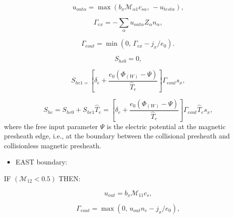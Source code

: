 \documentclass[11pt]{article}
\begin{document}
\begin{equation}
u_{out\alpha}=\max\left( b_{x}\mathcal{M}_{\alpha1}c_{s\alpha}\text{, }%
-u_{test\alpha}\right) \text{,}   \label{c184}
\end{equation}

\begin{equation}
\Gamma_{ex}=-\sum_{\alpha}u_{out\alpha}Z_{\alpha}n_{\alpha}\text{,} 
\label{c185}
\end{equation}

\begin{equation}
\Gamma_{eout}=\min\left( 0\text{, }\Gamma_{ex}-j_{x}/e_{0}\right) \text{.} 
\label{c186}
\end{equation}

\bigskip

\begin{equation}
S_{he0}=0\text{,}   \label{c187}
\end{equation}

\begin{equation}
S_{he1=}\left[ \delta_{e}+\frac{e_{0}\left( \Phi_{\left( W\right)
}-\Psi\right) }{\widehat{T}_{e}}\right] \Gamma_{eout}s_{x}\text{,} 
\label{c188}
\end{equation}

\begin{equation}
S_{he}=S_{he0}+S_{he1}\widehat{T}_{e}=\left[ \delta_{e}+\frac{e_{0}\left(
\Phi_{\left( W\right) }-\Psi\right) }{\widehat{T}_{e}}\right] \Gamma_{eout}%
\widehat{T}_{e}s_{x}\text{,}   \label{c189}
\end{equation}
where the free input parameter $\Psi$ is the electric potential at the
magnetic presheath edge, i.e., at the boundary between the collisional
presheath and collisionless magnetic presheath.

\bigskip

\begin{itemize}
\item  EAST boundary:
\end{itemize}

\bigskip

IF $\left( \mathcal{M}_{12}<0.5\right) $ THEN:

\begin{equation}
u_{out}=b_{x}\mathcal{M}_{11}c_{s}\text{,}   \label{c190}
\end{equation}

\begin{equation}
\Gamma_{eout}=\max\left( 0\text{, }u_{out}n_{e}-j_{x}/e_{0}\right) \text{,} 
\label{c191}
\end{equation}
\end{document}
